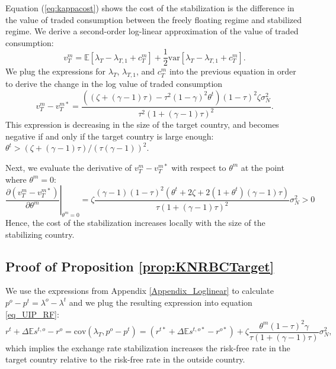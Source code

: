Equation (\ref{eq:kappacost}) shows the cost of the stabilization is
the difference in the value of traded consumption between the freely
floating regime and stabilized regime. We derive a second-order
log-linear approximation of the value of traded consumption:
\begin{equation*}
  v^m_{T} 
  = \mathbb{E}\left[ \lambda_T - \lambda_{T, 1} + c_T^m \right]
  + \frac{1}{2} \text{var} \left[ \lambda_T - \lambda_{T, 1} + c_T^m \right].
\end{equation*}
We plug the expressions for $\lambda_T$, $\lambda_{T, 1}$, and $c^m_T$
into the previous equation in order to derive the change in the log
value of traded consumption
\begin{equation*}
  v^m_T - v_T^{m \ast} = 
  \frac{\left(\left( \zeta + (\gamma - 1) \tau \right) - 
      \tau^2 (1 - \gamma)^2 \theta^t \right) (1 - \tau)^2 
    \zeta \sigma_N^2}{\tau^2 \left( 1 + (\gamma - 1)\tau \right)^2}.
\end{equation*}
This expression is decreasing in the size of the target country, and
becomes negative if and only if the target country is large enough:
$\theta^t > \left( \zeta + (\gamma - 1) \tau \right) / \left( \tau
  \left( \gamma - 1 \right) \right)^2$.

Next, we evaluate the derivative of $v^m_T - v_T^{m \ast}$ with
respect to $\theta^m$ at the point where $\theta^m = 0$:
\begin{equation*}
  \left .
    \frac{\partial (v^m_T - v_T^{m \ast})}{\partial \theta^m}
  \right \vert_{\theta^m = 0}
  = \zeta
  \frac{(\gamma - 1)(1 - \tau)^2\left( \theta^t + 2 \zeta + 2 (1 + \theta^t) (\gamma - 1) \tau \right)}{\tau \left( 1 + (\gamma - 1) \tau \right)^2} \sigma_N^2 > 0
\end{equation*}
Hence, the cost of the stabilization increases locally with the size
of the stabilizing country.


\subsection{Proof of Proposition
  \ref{prop:KNRBCTarget} \label{Appendix_KNRBCTarget}}

We use the expressions from Appendix \ref{Appendix_Loglinear} to
calculate $p^o - p^t = \lambda^o - \lambda^t$ and we plug the resulting
expression into equation \eqref{eq_UIP_RF}:
\begin{equation*}
  r^t + \Delta \mathbb{E}s^{t, o} - r^o
  = \text{cov}\left( \lambda_T, p^o - p^t \right)
  = \left(r^{t \ast} + \Delta \mathbb{E}s^{t, o \ast} - r^{o \ast} \right)
  + \zeta \frac{\theta^m (1 - \tau)^2 \gamma}{\tau \left( 1 + (\gamma - 1) \tau \right)} \sigma_N^2,
\end{equation*}
which implies the exchange rate stabilization increases the risk-free
rate in the target country relative to the risk-free rate in the
outside country. 


